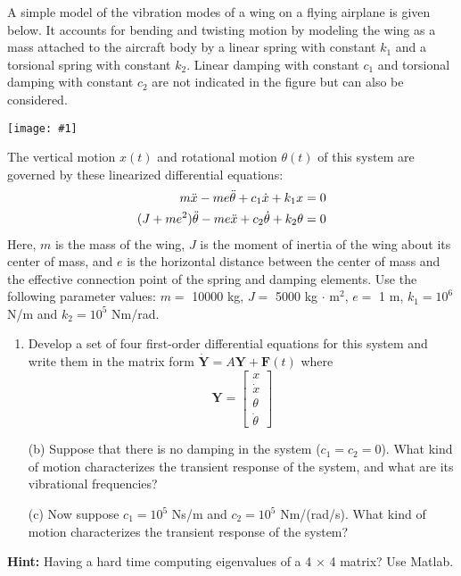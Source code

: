 \documentclass[12pt,letterpaper]{hmcpset}
\newcommand{\diagram}[2]{\begin{center}\texttt{[image: \#1]}\end{center}}
\begin{document}
	
	
	\begin{problem}[1]
		\setlength{\parskip}{3pt}
		A simple model of the vibration modes of a wing on a flying airplane is given below. It
		accounts for bending and twisting motion by modeling the wing as a mass attached to the
		aircraft body by a linear spring with constant $k_1$ and a torsional spring with constant $k_2$.
		Linear damping with constant $c_1$ and torsional damping with constant $c_2$ are not indicated in
		the figure but can also be considered.
		
		\diagram{Airplane}{5}
		
		The vertical motion $x(t)$ and rotational motion $\theta(t)$ of this system are governed by these
		linearized differential equations:
		\begin{displaymath}
		\begin{split}
		m\Ddot{x} - me\Ddot{\theta} + c_1 \Dot{x} + k_1 x &= 0\\
		(J + me^2)\Ddot{\theta} - me\Ddot{x} + c_2 \Dot{\theta} + k_2 \theta &= 0
		\end{split}
		\end{displaymath}
		Here, $m$ is the mass of the wing, $J$ is the moment of inertia of the wing about its center of
		mass, and $e$ is the horizontal distance between the center of mass and the effective connection
		point of the spring and damping elements.
		Use the following parameter values: $m =$ 10000 kg, $J =$ 5000 kg $\cdot$ m$^2$, $e =$ 1 m, $k_1 = 10^6$ N/m
		and $k_2 = 10^5$ Nm/rad.
		\begin{enumerate}
			\item Develop a set of four first-order differential equations for this system and write them in
			the matrix form $\Dot{\textbf{Y}} = A\textbf{Y} + \textbf{F}(t)$ where
			$$ \textbf{Y} = \begin{bmatrix}
				x\\
				\Dot{x}\\
				\theta\\
				\Dot{\theta}
				\end{bmatrix}
			$$
		\end{enumerate}
	\end{problem}
	
	\newpage
	
	\begin{problem}[1 (cont.)]
		\begin{enumerate}
		\item[(b)]  Suppose that there is no damping in the system ($c_1 = c_2 = 0$). What kind of motion
		characterizes the transient response of the system, and what are its vibrational frequencies?
		
		\item[(c)] Now suppose $c_1 = 10^5$ Ns/m and $c_2 = 10^5$ Nm/(rad/s). What kind of motion characterizes
		the transient response of the system?
		\end{enumerate}
	\textbf{Hint:} Having a hard time computing eigenvalues of a 4 × 4 matrix? Use Matlab.

	\end{problem}
	
\end{document}
